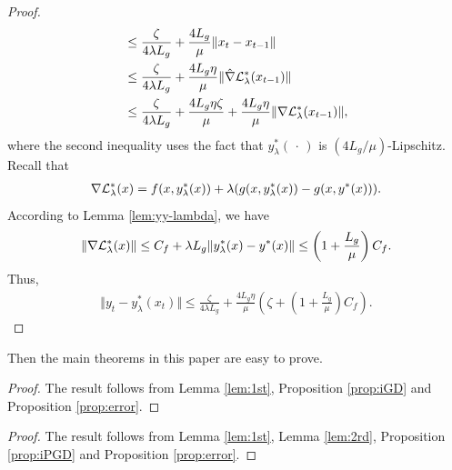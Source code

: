 \begin{proof}
\begin{align*}
    &\le \frac{\zeta}{4 \lambda L_g} + \frac{4 L_g}{\mu} \Vert x_t - x_{t-1} \Vert \\
    &\le \frac{\zeta}{4 \lambda L_g} + \frac{4 L_g \eta}{\mu} \Vert \hat \nabla {\mathcal{L}}_{\lambda}^*(x_{t-1})\Vert \\
    &\le \frac{\zeta}{4 \lambda L_g} + \frac{4 L_g \eta \zeta}{\mu} + \frac{4 L_g \eta}{\mu} \Vert \nabla {\mathcal{L}}_{\lambda}^*(x_{t-1})\Vert,
\end{align*}
where the second inequality uses the fact that $y_{\lambda}^*(\,\cdot\,)$ is $(4 L_g/\mu)$-Lipschitz.
    Recall that
    \begin{align*}
        \nabla {\mathcal{L}}_{\lambda}^*(x) = f(x,y_{\lambda}^*(x)) + \lambda ( 
        g(x,y_{\lambda}^*(x) ) - g(x,y^*(x))
        ).
    \end{align*}
    According to Lemma \ref{lem:yy-lambda}, we have
    \begin{align*}
        \Vert \nabla {\mathcal{L}}_{\lambda}^*(x) \Vert \le C_f + \lambda L_g \Vert y_{\lambda}^*(x) - y^*(x) \Vert \le \left( 1 + \frac{L_g}{\mu}\right) C_f.
    \end{align*}
Thus,
\begin{align*}
    \Vert y_t - y_{\lambda}^*(x_t) \Vert \le \frac{\zeta}{4 \lambda L_g} + \frac{4 L_g \eta }{\mu} \left( \zeta +   \left( 1 + \frac{L_g}{\mu}\right) C_f\right).
\end{align*}

\end{proof}

Then the main theorems in this paper are easy to prove.

\thmFBA* 
\begin{proof}
The result follows from
Lemma \ref{lem:1st}, Proposition \ref{prop:iGD} and Proposition \ref{prop:error}.
\end{proof}

\thmPFBA*
\begin{proof}
The result follows from
Lemma \ref{lem:1st}, Lemma \ref{lem:2rd}, Proposition \ref{prop:iPGD} and Proposition \ref{prop:error}.
\end{proof}



